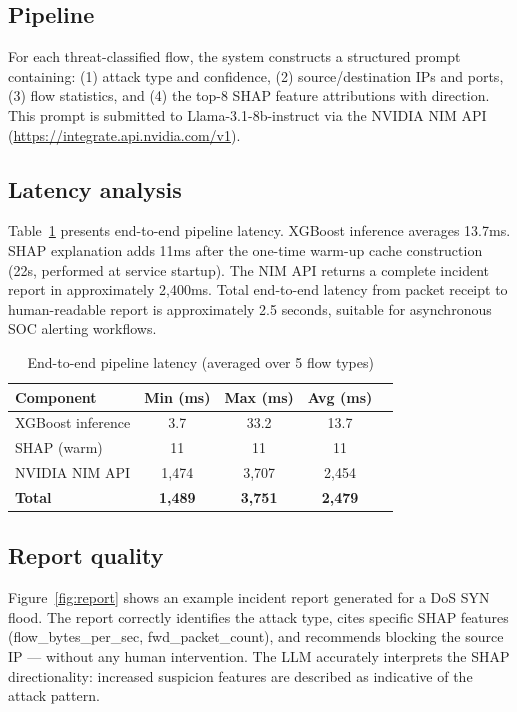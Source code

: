 \documentclass[review]{elsarticle}  %
\begin{document}
\subsection{Pipeline}

For each threat-classified flow, the system constructs a
structured prompt containing: (1) attack type and confidence,
(2) source/destination IPs and ports, (3) flow statistics,
and (4) the top-8 SHAP feature attributions with direction.
This prompt is submitted to Llama-3.1-8b-instruct via the
NVIDIA NIM API (\url{https://integrate.api.nvidia.com/v1}).

\subsection{Latency analysis}

Table~\ref{tab:latency} presents end-to-end pipeline latency.
XGBoost inference averages 13.7ms. SHAP explanation adds 11ms
after the one-time warm-up cache construction (22s, performed
at service startup). The NIM API returns a complete incident
report in approximately 2,400ms. Total end-to-end latency
from packet receipt to human-readable report is approximately
2.5 seconds, suitable for asynchronous SOC alerting workflows.

\begin{table}[h]
\centering
\caption{End-to-end pipeline latency (averaged over 5 flow types)}
\label{tab:latency}
\begin{tabular}{lcccc}
\hline
\textbf{Component} & \textbf{Min (ms)} & \textbf{Max (ms)} & \textbf{Avg (ms)} \\
\hline
XGBoost inference & 3.7 & 33.2 & 13.7 \\
SHAP (warm) & 11 & 11 & 11 \\
NVIDIA NIM API & 1,474 & 3,707 & 2,454 \\
\hline
\textbf{Total} & \textbf{1,489} & \textbf{3,751} & \textbf{2,479} \\
\hline
\end{tabular}
\end{table}

\subsection{Report quality}

Figure~\ref{fig:report} shows an example incident report
generated for a DoS SYN flood. The report correctly identifies
the attack type, cites specific SHAP features (flow\_bytes\_per\_sec,
fwd\_packet\_count), and recommends blocking the source IP —
without any human intervention. The LLM accurately interprets
the SHAP directionality: increased suspicion features are
described as indicative of the attack pattern.
\end{document}
